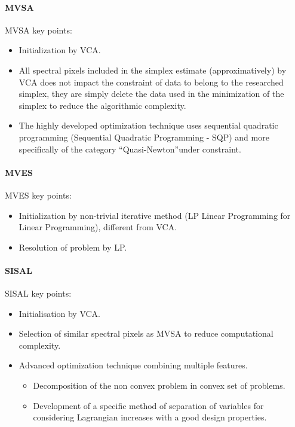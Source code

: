 \paragraph{MVSA \cite{Li2008} } 
MVSA key points: 
\begin{itemize}
\item {Initialization by VCA.}
\item {All spectral pixels included in the simplex estimate
  (approximatively) by VCA does not impact the constraint of  data to belong to the researched simplex, they are
  simply delete the data used in the minimization of the
  simplex to reduce the algorithmic complexity.}
\item {The highly developed optimization technique uses
  sequential quadratic programming (Sequential Quadratic
  Programming - SQP) and more specifically of the category
  ``Quasi-Newton''under constraint.}
\end{itemize} 

\paragraph{MVES \cite{Chan2009}}
 MVES key points: 
\begin{itemize}
\item {Initialization by non-trivial
  iterative method (LP Linear Programming for Linear
  Programming), different from VCA.}
\item {Resolution of problem by LP.}
\end{itemize} 
 

\paragraph{SISAL \cite{Dias2009}}
SISAL key points:
\begin{itemize}
\item {Initialisation by VCA.}
\item {Selection of similar spectral pixels as MVSA to reduce computational complexity.}
\item {Advanced optimization technique
combining multiple features.}
\begin{itemize}
\item {Decomposition of the non convex problem
in convex set of problems.}
\item {Development of a
specific method of separation of variables for considering
Lagrangian increases with a good design properties.}
\end{itemize}
\end{itemize} 

